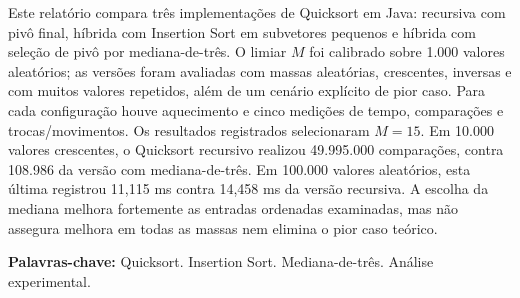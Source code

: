 \begin{resumo}
\vspace{-1cm}
\onehalfspacing
Este relatório compara três implementações de Quicksort em Java: recursiva com pivô final, híbrida com Insertion Sort em subvetores pequenos e híbrida com seleção de pivô por mediana-de-três. O limiar $M$ foi calibrado sobre 1.000 valores aleatórios; as versões foram avaliadas com massas aleatórias, crescentes, inversas e com muitos valores repetidos, além de um cenário explícito de pior caso. Para cada configuração houve aquecimento e cinco medições de tempo, comparações e trocas/movimentos. Os resultados registrados selecionaram $M=15$. Em 10.000 valores crescentes, o Quicksort recursivo realizou 49.995.000 comparações, contra 108.986 da versão com mediana-de-três. Em 100.000 valores aleatórios, esta última registrou 11,115 ms contra 14,458 ms da versão recursiva. A escolha da mediana melhora fortemente as entradas ordenadas examinadas, mas não assegura melhora em todas as massas nem elimina o pior caso teórico.
\par\vspace*{.75cm}
\noindent \textbf{Palavras-chave:} Quicksort. Insertion Sort. Mediana-de-três. Análise experimental.
\end{resumo}
